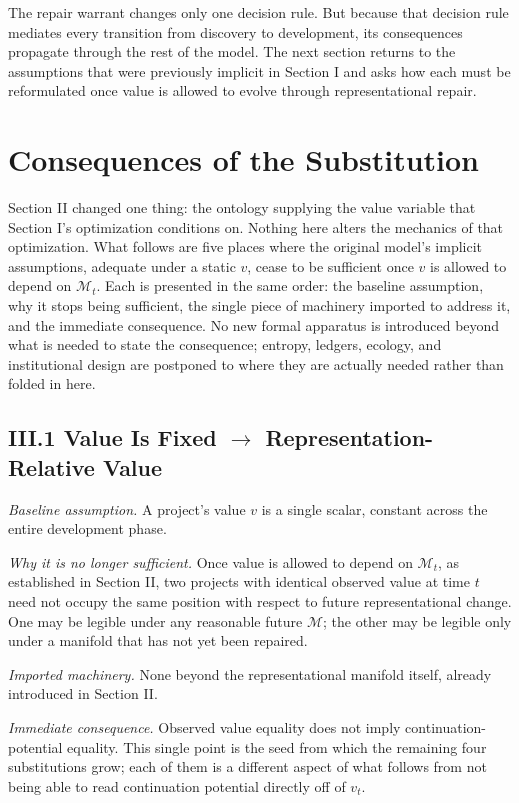 \documentclass[11pt]{article}
\begin{document}
The repair warrant changes only one decision rule. But because that decision rule mediates every transition from discovery to development, its consequences propagate through the rest of the model. The next section returns to the assumptions that were previously implicit in Section I and asks how each must be reformulated once value is allowed to evolve through representational repair.

\section{Consequences of the Substitution}

Section II changed one thing: the ontology supplying the value variable that Section I's optimization conditions on. Nothing here alters the mechanics of that optimization. What follows are five places where the original model's implicit assumptions, adequate under a static $v$, cease to be sufficient once $v$ is allowed to depend on $\mathcal{M}_t$. Each is presented in the same order: the baseline assumption, why it stops being sufficient, the single piece of machinery imported to address it, and the immediate consequence. No new formal apparatus is introduced beyond what is needed to state the consequence; entropy, ledgers, ecology, and institutional design are postponed to where they are actually needed rather than folded in here.

\subsection*{III.1 \quad Value Is Fixed $\rightarrow$ Representation-Relative Value}

\textit{Baseline assumption.} A project's value $v$ is a single scalar, constant across the entire development phase.

\textit{Why it is no longer sufficient.} Once value is allowed to depend on $\mathcal{M}_t$, as established in Section II, two projects with identical observed value at time $t$ need not occupy the same position with respect to future representational change. One may be legible under any reasonable future $\mathcal{M}$; the other may be legible only under a manifold that has not yet been repaired.

\textit{Imported machinery.} None beyond the representational manifold itself, already introduced in Section II.

\textit{Immediate consequence.} Observed value equality does not imply continuation-potential equality. This single point is the seed from which the remaining four substitutions grow; each of them is a different aspect of what follows from not being able to read continuation potential directly off of $v_t$.
\end{document}
